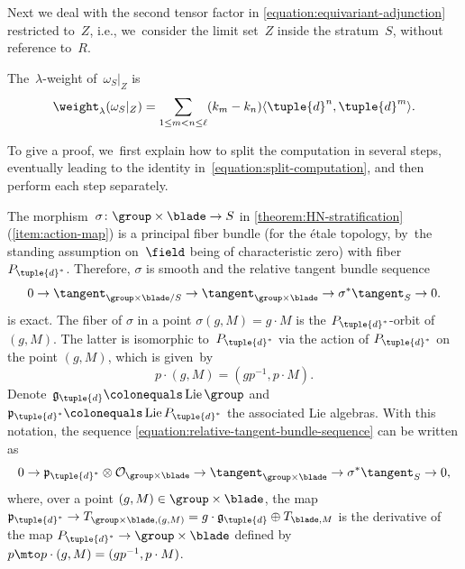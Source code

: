 Next we deal with the second tensor factor in \eqref{equation:equivariant-adjunction}
restricted to~$Z$,
i.e., we~consider the limit set~$Z$ inside the stratum~$S$,
without reference to~$R$.
\begin{lemma}
\label{lemma:omega-SZ-weight}
The~$\lambda$-weight of~$\omega_S|_Z$ is
\begin{equation}
\weight_{\lambda}(\omega_S|_Z) = \sum_{1\leq m<n\leq\ell}(k_m-k_n)\langle \tuple{d}^n,\tuple{d}^m\rangle.
\end{equation}
\end{lemma}
To give a proof, we~first explain how to split the computation in several steps,
eventually leading to the identity in~\eqref{equation:split-computation},
and then perform each step separately.

The morphism~$\sigma\colon \group \times \blade \to S$
in \cref{theorem:HN-stratification}(\ref{item:action-map})
is a principal fiber bundle (for the étale topology, by~the standing assumption on~$\field$ being of characteristic zero)
with fiber $P_{\tuple{d}^*}$.
Therefore, $\sigma$ is smooth and the relative tangent bundle sequence
\begin{equation}
\label{equation:relative-tangent-bundle-sequence}
0
\to\tangent_{\group \times \blade/S}
\to\tangent_{\group \times \blade}
\to\sigma^*\tangent_{S}
\to0.
\end{equation}
is exact.
The fiber of $\sigma$ in a point $\sigma(g,M) = g\cdot M$ is the $P_{\tuple{d}^*}$-orbit of $(g,M)$.
The latter is isomorphic to~$P_{\tuple{d}^*}$ via the action of $P_{\tuple{d}^*}$ on the point $(g,M)$, which is given~by
\begin{equation*}
p \cdot (g,M) = (gp^{-1}, p\cdot M).
\end{equation*}
Denote~$\mathfrak{g}_{\tuple{d}}\colonequals\operatorname{Lie}\group$
and~$\mathfrak{p}_{\tuple{d}^*}\colonequals\operatorname{Lie}P_{\tuple{d}^*}$
the associated Lie algebras.
With this notation,
the sequence \eqref{equation:relative-tangent-bundle-sequence} can be written as
\begin{equation}
\label{equation:relative-tangent-bundle-sequence-rewritten}
0
\to\mathfrak{p}_{\tuple{d}^*} \otimes \mathcal{O}_{\group \times \blade}
\to\tangent_{\group \times \blade}
\to\sigma^*\tangent_{S}
\to0,
\end{equation}
where, over a point $(g,M) \in \group \times \blade$,
the map $\mathfrak{p}_{\tuple{d}^*} \to T_{\group \times \blade,(g,M)} = g\cdot \mathfrak{g}_{\tuple{d}} \oplus T_{\blade,M}$
is the derivative of the map $P_{\tuple{d}^*} \to \group \times \blade$
defined by $p \mto p\cdot (g,M) = (gp^{-1}, p\cdot M)$.

